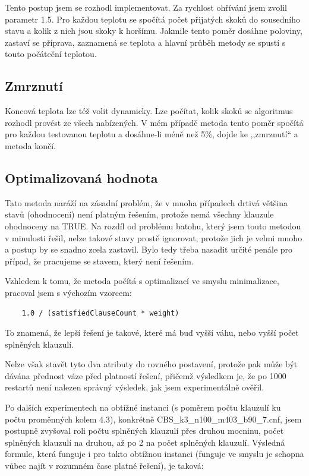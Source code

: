 \documentclass[12pt,a4paper]{article}
\begin{document}
Tento postup jsem se rozhodl implementovat. Za rychlost ohřívání jsem zvolil parametr 1.5. Pro každou teplotu se spočítá počet přijatých skoků do sousedního stavu a kolik z nich jsou skoky k horšímu. Jakmile tento poměr dosáhne poloviny, zastaví se příprava, zaznamená se teplota a hlavní průběh metody se spustí s touto počáteční teplotou.


\subsection{Zmrznutí}

Koncová teplota lze též volit dynamicky. Lze počítat, kolik skoků se algoritmus rozhodl provést ze všech nabízených. V mém případě metoda tento poměr spočítá pro každou testovanou teplotu a dosáhne-li méně než 5\%, dojde ke ,,zmrznutí`` a metoda končí.







\subsection{Optimalizovaná hodnota}

Tato metoda naráží na zásadní problém, že v mnoha případech drtivá většina stavů (ohodnocení) není platným řešením, protože nemá všechny klauzule ohodnoceny na TRUE. Na rozdíl od problému batohu, který jsem touto metodou v minulosti řešil, nelze takové stavy prostě ignorovat, protože jich je velmi mnoho a postup by se snadno zcela zastavil. Bylo tedy třeba nasadit určité penále pro případ, že pracujeme se stavem, který není řešením.

Vzhledem k tomu, že metoda počítá s optimalizací ve smyslu minimalizace, pracoval jsem s výchozím vzorcem:

\begin{verbatim}
    1.0 / (satisfiedClauseCount * weight)
\end{verbatim}

To znamená, že lepší řešení je takové, které má buď vyšší váhu, nebo vyšší počet splněných klauzulí. 

Nelze však stavět tyto dva atributy do rovného postavení, protože pak může být dávána přednost váze před platností řešení, přičemž výsledkem je, že po 1000 restartů není nalezen správný výsledek, jak jsem experimentálně ověřil.

Po dalších experimentech na obtížné instanci (s poměrem počtu klauzulí ku počtu proměnných kolem 4.3), konkrétně CBS\_k3\_n100\_m403\_b90\_7.cnf, jsem postupně zvyšoval roli počtu splněných klauzulí přes druhou mocninu, počet splněných klauzulí na druhou, až po 2 na počet splněných klauzulí. Výsledná formule, která funguje i pro takto obtížnou instanci (funguje ve smyslu je schopna vůbec najít v rozumném čase platné řešení), je taková:
\end{document}
